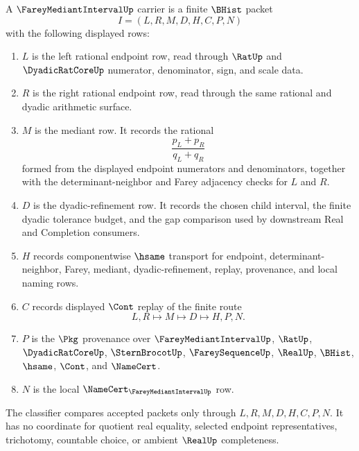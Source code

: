 \begin{definition}
\label{def:farey-mediant-interval-carrier}
A $\FareyMediantIntervalUp$ carrier is a finite $\BHist$ packet
$$
I=(L,R,M,D,H,C,P,N)
$$
with the following displayed rows:
\begin{enumerate}
\item $L$ is the left rational endpoint row, read through $\RatUp$ and $\DyadicRatCoreUp$ numerator, denominator, sign, and scale data.
\item $R$ is the right rational endpoint row, read through the same rational and dyadic arithmetic surface.
\item $M$ is the mediant row. It records the rational
$$
\frac{p_L+p_R}{q_L+q_R}
$$
formed from the displayed endpoint numerators and denominators, together with the determinant-neighbor and Farey adjacency checks for $L$ and $R$.
\item $D$ is the dyadic-refinement row. It records the chosen child interval, the finite dyadic tolerance budget, and the gap comparison used by downstream Real and Completion consumers.
\item $H$ records componentwise $\hsame$ transport for endpoint, determinant-neighbor, Farey, mediant, dyadic-refinement, replay, provenance, and local naming rows.
\item $C$ records displayed $\Cont$ replay of the finite route
$$
L,R \longmapsto M \longmapsto D \longmapsto H,P,N .
$$
\item $P$ is the $\Pkg$ provenance over $\FareyMediantIntervalUp$, $\RatUp$, $\DyadicRatCoreUp$, $\SternBrocotUp$, $\FareySequenceUp$, $\RealUp$, $\BHist$, $\hsame$, $\Cont$, and $\NameCert$.
\item $N$ is the local $\NameCert_{\FareyMediantIntervalUp}$ row.
\end{enumerate}
The classifier compares accepted packets only through $L,R,M,D,H,C,P,N$. It has no coordinate for quotient real equality, selected endpoint representatives, trichotomy, countable choice, or ambient $\RealUp$ completeness.
\end{definition}

